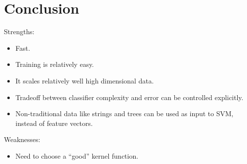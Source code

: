 \documentclass[
	number={2},
	title={Learning Linear Separators{,} SVMs and Kernels}
]{cs584notes}
\begin{document}
\section{Conclusion}\label{sec:conclusion}
Strengths:
\begin{itemize}
	\item Fast.
	\item Training is relatively easy.
	\item It scales relatively well high dimensional data.
	\item Tradeoff between classifier complexity and error can be controlled explicitly.
	\item Non-traditional data like strings and trees can be used as input to SVM, instead of feature vectors.
\end{itemize}

Weaknesses:
\begin{itemize}
	\item Need to choose a ``good'' kernel function.
\end{itemize}
\end{document}

